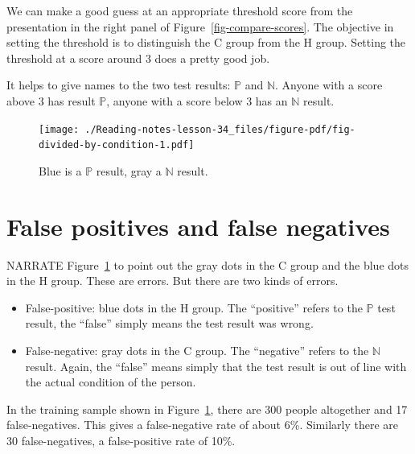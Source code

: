 \documentclass[
  letterpaper,
  DIV=11,
  numbers=noendperiod,
  oneside]{scrreprt}
\begin{document}
We can make a good guess at an appropriate threshold score from the
presentation in the right panel of Figure~\ref{fig-compare-scores}. The
objective in setting the threshold is to distinguish the C group from
the H group. Setting the threshold at a score around 3 does a pretty
good job.

It helps to give names to the two test results: \({\mathbb{P}}\) and
\({\mathbb{N}}\). Anyone with a score above 3 has result
\({\mathbb{P}}\), anyone with a score below 3 has an \({\mathbb{N}}\)
result.

\begin{figure}

{\centering \texttt{[image: ./Reading-notes-lesson-34\_files/figure-pdf/fig-divided-by-condition-1.pdf]}

}

\caption{\label{fig-divided-by-condition}Blue is a \(\mathbb{P}\)
result, gray a \(\mathbb{N}\) result.}

\end{figure}

\hypertarget{false-positives-and-false-negatives}{%
\section{False positives and false
negatives}\label{false-positives-and-false-negatives}}

NARRATE Figure~\ref{fig-divided-by-condition} to point out the gray dots
in the C group and the blue dots in the H group. These are errors. But
there are two kinds of errors.

\begin{itemize}
\item
  False-positive: blue dots in the H group. The ``positive'' refers to
  the \({\mathbb{P}}\) test result, the ``false'' simply means the test
  result was wrong.
\item
  False-negative: gray dots in the C group. The ``negative'' refers to
  the \({\mathbb{N}}\) result. Again, the ``false'' means simply that
  the test result is out of line with the actual condition of the
  person.
\end{itemize}

In the training sample shown in Figure~\ref{fig-divided-by-condition},
there are 300 people altogether and 17 false-negatives. This gives a
false-negative rate of about 6\%. Similarly there are 30
false-negatives, a false-positive rate of 10\%.
\end{document}
